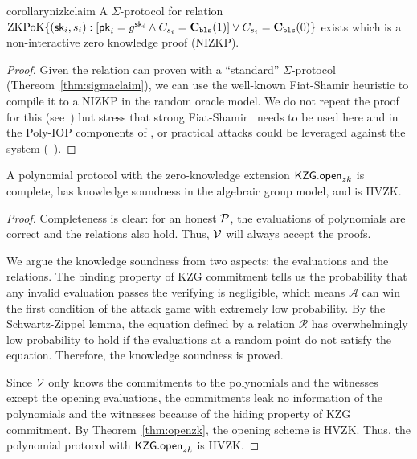 
\begin{restatable}{corollary}{nizkclaim}
\label{thm:nizkclaim}
A $\Sigma$-protocol for relation $\mathrm{ZKPoK} \{ (\mathsf{sk}_i,s_i) :  [\mathsf{pk}_i=g^{\mathsf{sk}_i} \land C_{s_i}=\textbf{C}_\texttt{bls}(1)  ] \lor C_{s_i}=\textbf{C}_\texttt{bls}(0) \}$ exists which is a non-interactive zero knowledge proof (NIZKP).
\end{restatable}
    
\begin{proof}
Given the relation can proven with a ``standard'' $\Sigma$-protocol (Thereom~\ref{thm:sigmaclaim}), we can use the well-known Fiat-Shamir heuristic to compile it to a NIZKP in the random oracle model. We do not repeat the proof for this (see~\cite{damgard10,sigma}) but stress that strong Fiat-Shamir~\cite{weakfs} needs to be used here and in the Poly-IOP components of \Sys, or practical attacks could be leveraged against the system (\cf~\cite{weakfsattacks}).
\end{proof}


\begin{theorem}
\label{thm:polyproto}
A polynomial protocol with the zero-knowledge extension $\mathsf{KZG.open}_{zk}$ is complete, has knowledge soundness in the algebraic group model, and is HVZK.
\end{theorem}

\begin{proof}
Completeness is clear: for an honest $\mathcal{P}$, the evaluations of polynomials are correct and the relations also hold. Thus, $\mathcal{V}$ will always accept the proofs.

We argue the knowledge soundness from two aspects: the evaluations and the relations. The binding property of KZG commitment tells us the probability that any invalid evaluation passes the verifying is negligible, which means $\mathcal{A}$ can win the first condition of the attack game with extremely low probability. By the Schwartz-Zippel lemma, the equation defined by a relation $\mathcal{R}$ has overwhelmingly low probability to hold if the evaluations at a random point do not satisfy the equation. Therefore, the knowledge soundness is proved.

Since $\mathcal{V}$ only knows the commitments to the polynomials and the witnesses except the opening evaluations, the commitments leak no information of the polynomials and the witnesses because of the hiding property of KZG commitment. By Theorem~\ref{thm:openzk}, the opening scheme is HVZK. Thus, the polynomial protocol with $\mathsf{KZG.open}_{zk}$ is HVZK.
\end{proof}

